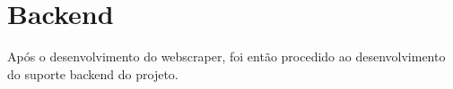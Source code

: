 
\section{Backend}
Após o desenvolvimento do webscraper, foi então procedido ao desenvolvimento do suporte backend do projeto.











\newpage





\newpage



